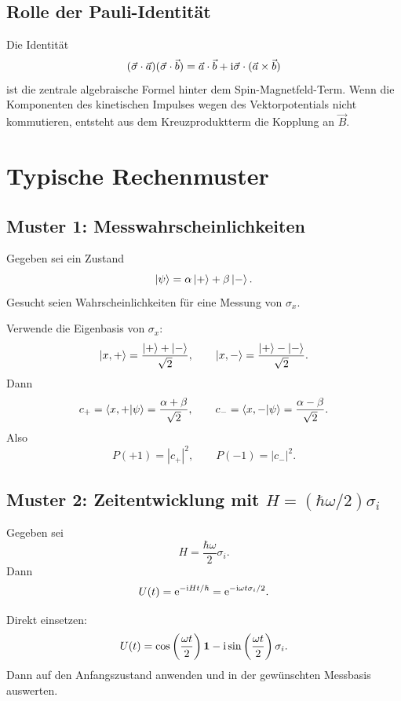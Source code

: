 \subsection{Rolle der Pauli-Identität}

Die Identität
\[
    (\vec\sigma\cdot\vec a)(\vec\sigma\cdot\vec b)
    =\vec a\cdot\vec b+\mathrm{i}\vec\sigma\cdot(\vec a\times\vec b)
\]
ist die zentrale algebraische Formel hinter dem Spin-Magnetfeld-Term. Wenn die Komponenten des kinetischen Impulses wegen des Vektorpotentials nicht kommutieren, entsteht aus dem Kreuzproduktterm die Kopplung an \(\vec B\).

\section{Typische Rechenmuster}

\subsection{Muster 1: Messwahrscheinlichkeiten}

Gegeben sei ein Zustand
\[
    \left|\psi\right\rangle=\alpha\left|+\right\rangle+\beta\left|-\right\rangle.
\]
Gesucht seien Wahrscheinlichkeiten für eine Messung von \(\sigma_x\).

\begin{calculationbox}
Verwende die Eigenbasis von \(\sigma_x\):
\[
    \left|x,+\right\rangle=\frac{\left|+\right\rangle+\left|-\right\rangle}{\sqrt2},
    \qquad
    \left|x,-\right\rangle=\frac{\left|+\right\rangle-\left|-\right\rangle}{\sqrt2}.
\]
Dann
\[
    c_+=\left\langle x,+\middle|\psi\right\rangle=\frac{\alpha+\beta}{\sqrt2},
    \qquad
    c_- =\left\langle x,-\middle|\psi\right\rangle=\frac{\alpha-\beta}{\sqrt2}.
\]
Also
\[
    P(+1)=|c_+|^2,
    \qquad
    P(-1)=|c_-|^2.
\]
\end{calculationbox}

\subsection{Muster 2: Zeitentwicklung mit \(H=(\hbar\omega/2)\sigma_i\)}

Gegeben sei
\[
    H=\frac{\hbar\omega}{2}\sigma_i.
\]
Dann
\[
    U(t)=\mathrm{e}^{-\mathrm{i} Ht/\hbar}
    =\mathrm{e}^{-\mathrm{i}\omega t\sigma_i/2}.
\]

\begin{calculationbox}
Direkt einsetzen:
\[
    U(t)=\cos\left(\frac{\omega t}{2}\right)\mathbf{1}
    -\mathrm{i}\sin\left(\frac{\omega t}{2}\right)\sigma_i.
\]
Dann auf den Anfangszustand anwenden und in der gewünschten Messbasis auswerten.
\end{calculationbox}

